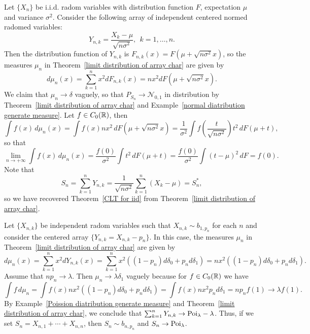 \begin{example}
Let $\{X_n\}$ be i.i.d. radom variables with distribution function $F$, expectation $\mu$ and variance $\sigma^2$. Consider the following array of independent centered normed radomed variables:
\[Y_{n,k}=\frac{X_k-\mu}{\sqrt{n\sigma^2}},\ \ k=1,\dots,n.\]
Then the distribution function of $Y_{n,k}$ is $F_{n,k}(x)=F(\mu+\sqrt{n\sigma^2}x)$, so the measures $\mu_n$ in Theorem~\ref{limit distribution of array char} are given by
\[d\mu_n(x)=\sum_{k=1}^{n}x^2dF_{n,k}(x)=nx^2dF(\mu+\sqrt{n\sigma^2}x).\]
We claim that $\mu_n\to\delta$ vaguely, so that $P_{S_n}\to \mathcal{N}_{0,1}$ in distribution by Theorem~\ref{limit distribution of array char} and Example~\ref{normal diatribution generate measure}. Let $f\in C_0(\mathbb{R})$, then
\[\int f(x)\,d\mu_n(x)=\int f(x)nx^2\,dF(\mu+\sqrt{n\sigma^2}x)=\frac{1}{\sigma^2}\int f(\frac{t}{\sqrt{n\sigma^2}})t^2\,dF(\mu+t),\]
so that
\[\lim_{n\to+\infty}\int f(x)\,d\mu_n(x)=\frac{f(0)}{\sigma^2}\int t^2\,dF(\mu+t)=\frac{f(0)}{\sigma^2}\int(t-\mu)^2\,dF=f(0).\]
Note that
\[S_n=\sum_{k=1}^{n}Y_{n,k}=\frac{1}{\sqrt{n\sigma^2}}\sum_{k=1}^{n}(X_k-\mu)=S_n^*,\]
so we have recovered Theorem~\ref{CLT for iid} from Theorem~\ref{limit distribution of array char}.
\end{example}
\begin{example}
Let $\{X_{n,k}\}$ be independent radom variables such that $X_{n,k}\sim b_{1,p_n}$ for each $n$ and consider the centered array $\{Y_{n,k}=X_{n,k}-p_n\}$. In this case, the measures $\mu_n$ in Theorem~\ref{limit distribution of array char} are given by
\[d\mu_n(x)=\sum_{k=1}^{n}x^2dY_{n,k}(x)=\sum_{k=1}^{n}x^2((1-p_n)d\delta_0+p_nd\delta_1)=nx^2((1-p_n)d\delta_0+p_nd\delta_1).\]
Assume that $np_n\to\lambda$. Then $\mu_n\to\lambda\delta_1$ vaguely because for $f\in C_0(\mathbb{R})$ we have
\[\int f\,d\mu_n=\int f(x)nx^2((1-p_n)d\delta_0+p_nd\delta_1)=\int f(x)nx^2p_nd\delta_1=np_nf(1)\to\lambda f(1).\]
By Example~\ref{Poission diatribution generate measure} and Theorem~\ref{limit distribution of array char}, we conclude that $\sum_{k=1}^{n}Y_{n,k}\to\mathrm{Poi}_\lambda-\lambda$. Thus, if we set $S_n=X_{n,1}+\cdots+X_{n,n}$, then $S_n\sim b_{n,p_n}$ and $S_n\to\mathrm{Poi}_\lambda$.
\end{example}